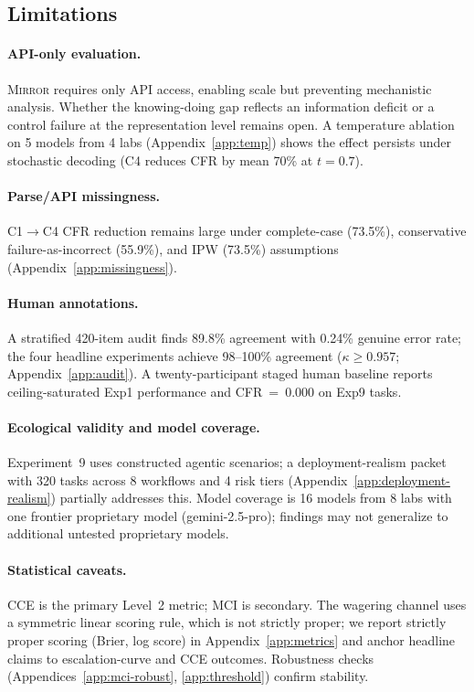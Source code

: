 \documentclass[10pt]{article}
\newcommand{\mirror}{\textsc{Mirror}}
\newcommand{\MCI}{MCI}
\newcommand{\CCE}{CCE}
\begin{document}
\subsection{Limitations}

\paragraph{API-only evaluation.}
\mirror{} requires only API access, enabling scale but preventing mechanistic analysis. Whether the knowing-doing gap reflects an information deficit or a control failure at the representation level remains open. A temperature ablation on 5 models from 4 labs (Appendix~\ref{app:temp}) shows the effect persists under stochastic decoding (C4 reduces CFR by mean 70\% at $t\!=\!0.7$).

\paragraph{Parse/API missingness.}
C1$\to$C4 CFR reduction remains large under complete-case (73.5\%), conservative failure-as-incorrect (55.9\%), and IPW (73.5\%) assumptions (Appendix~\ref{app:missingness}).

\paragraph{Human annotations.}
A stratified 420-item audit finds 89.8\% agreement with 0.24\% genuine error rate; the four headline experiments achieve 98--100\% agreement ($\kappa \geq 0.957$; Appendix~\ref{app:audit}). A twenty-participant staged human baseline reports ceiling-saturated Exp1 performance and CFR~=~0.000 on Exp9 tasks.

\paragraph{Ecological validity and model coverage.}
Experiment~9 uses constructed agentic scenarios; a deployment-realism packet with 320 tasks across 8 workflows and 4 risk tiers (Appendix~\ref{app:deployment-realism}) partially addresses this. Model coverage is 16 models from 8 labs with one frontier proprietary model (gemini-2.5-pro); findings may not generalize to additional untested proprietary models.

\paragraph{Statistical caveats.}
\CCE{} is the primary Level~2 metric; \MCI{} is secondary. The wagering channel uses a symmetric linear scoring rule, which is not strictly proper; we report strictly proper scoring (Brier, log score) in Appendix~\ref{app:metrics} and anchor headline claims to escalation-curve and \CCE{} outcomes. Robustness checks (Appendices~\ref{app:mci-robust}, \ref{app:threshold}) confirm stability.
\end{document}
